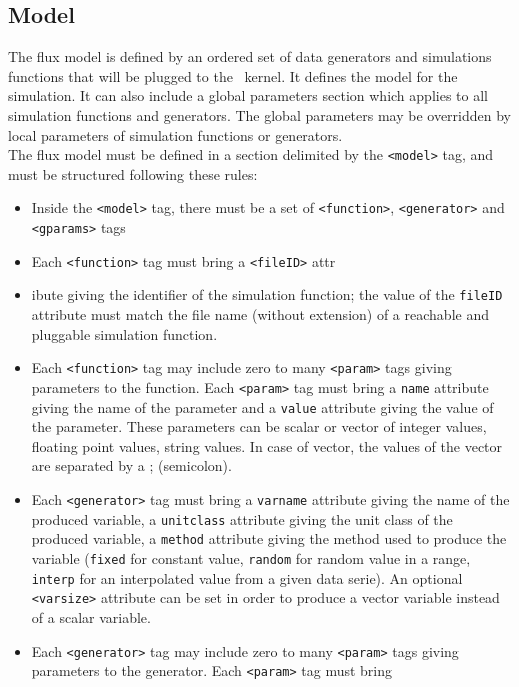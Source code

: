 \subsection{Model}

The flux model is defined by an ordered set of data generators and simulations functions that will be plugged to the \OFEname \ kernel.
It defines the model for the simulation. It can also include a global
parameters section which applies to all simulation functions and generators.
The global parameters may be overridden by local parameters of
simulation functions or generators.\\
\noindent The flux model must be defined in a section delimited by the
\texttt{<model>} tag, and must be structured following these rules:
\begin{itemize}
  \item Inside the \texttt{<model>} tag, there must be a set of \texttt{<function>}, \texttt{<generator>} and \texttt{<gparams>} tags 
  \item Each \texttt{<function>} tag must bring a \texttt{<fileID>} attr\item ibute giving
  the identifier of the simulation function; the value of the \texttt{fileID} attribute must match the file name (without extension)
  of a reachable and pluggable simulation function.
  \item Each \texttt{<function>} tag may include zero to many \texttt{<param>} tags giving
  parameters to the function. Each \texttt{<param>} tag must bring a \texttt{name} attribute giving
  the name of the parameter and a \texttt{value} attribute giving the value of the parameter. These parameters can be scalar or vector of integer values, floating point values, string values. In case of vector, the values of the vector are separated by a ; (semicolon).
  \item Each \texttt{<generator>} tag must bring a \texttt{varname} attribute giving 
  the name of the produced variable, a \texttt{unitclass} attribute giving the 
  unit class of the produced variable, a \texttt{method} attribute giving the 
  method used to produce the variable (\texttt{fixed} for constant value,
  \texttt{random} for random value in a range, \texttt{interp} for an
  interpolated value from a given data serie). An optional \texttt{<varsize>}
  attribute can be set in order to produce a vector variable instead of a scalar variable.
  \item Each \texttt{<generator>} tag may include zero to many \texttt{<param>}
  tags giving parameters to the generator. Each \texttt{<param>} tag must bring

\end{itemize}
